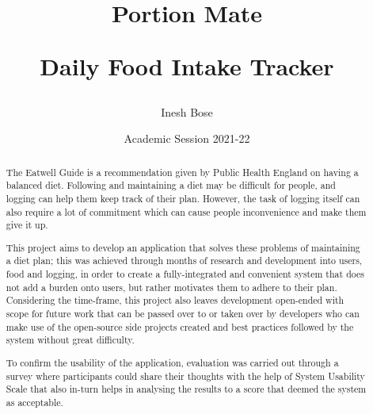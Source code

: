 \documentclass{l4proj}
\begin{document}

\title{%
    \par
    {\Huge Portion Mate \par}
    {\Large Daily Food Intake Tracker \par}
    \large
}
\author{Inesh Bose}
\date{Academic Session 2021-22}

\maketitle



\begin{abstract}
    The Eatwell Guide is a recommendation given by Public Health England on having a balanced diet. Following and maintaining a diet may be difficult for people, and logging can help them keep track of their plan. However, the task of logging itself can also require a lot of commitment which can cause people inconvenience and make them give it up.

    This project aims to develop an application that solves these problems of maintaining a diet plan; this was achieved through months of research and development into users, food and logging, in order to create a fully-integrated and convenient system that does not add a burden onto users, but rather motivates them to adhere to their plan. Considering the time-frame, this project also leaves development open-ended with scope for future work that can be passed over to or taken over by developers who can make use of the open-source side projects created and best practices followed by the system without great difficulty.

    To confirm the usability of the application, evaluation was carried out through a survey where participants could share their thoughts with the help of System Usability Scale that also in-turn helps in analysing the results to a score that deemed the system as acceptable.
\end{abstract}
\end{document}
